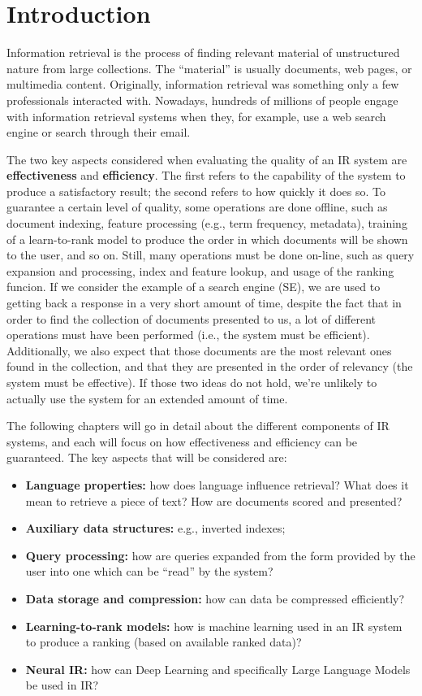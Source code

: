 \chapter{Introduction}

Information retrieval is the process of finding relevant material of unstructured nature from large collections. The ``material'' is usually documents, web pages, or multimedia content. Originally, information retrieval was something only a few professionals interacted with. Nowadays, hundreds of millions of people engage with information retrieval systems when they, for example, use a web search engine or search through their email.

The two key aspects considered when evaluating the quality of an IR system are \textbf{effectiveness} and \textbf{efficiency}. The first refers to the capability of the system to produce a satisfactory result; the second refers to how quickly it does so. To guarantee a certain level of quality, some operations are done offline, such as document indexing, feature processing (e.g., term frequency, metadata), training of a learn-to-rank model to produce the order in which documents will be shown to the user, and so on. Still, many operations must be done on-line, such as query expansion and processing, index and feature lookup, and usage of the ranking funcion. If we consider the example of a search engine (SE), we are used to getting back a response in a very short amount of time, despite the fact that in order to find the collection of documents presented to us, a lot of different operations must have been performed (i.e., the system must be efficient). Additionally, we also expect that those documents are the most relevant ones found in the collection, and that they are presented in the order of relevancy (the system must be effective). If those two ideas do not hold, we're unlikely to actually use the system for an extended amount of time.

The following chapters will go in detail about the different components of IR systems, and each will focus on how effectiveness and efficiency can be guaranteed. The key aspects that will be considered are:
\begin{itemize}
    \item \textbf{Language properties:} how does language influence retrieval? What does it mean to retrieve a piece of text? How are documents scored and presented?
    \item \textbf{Auxiliary data structures:} e.g., inverted indexes;
    \item \textbf{Query processing:} how are queries expanded from the form provided by the user into one which can be ``read'' by the system?
    \item \textbf{Data storage and compression:} how can data be compressed efficiently?
    \item \textbf{Learning-to-rank models:} how is machine learning used in an IR system to produce a ranking (based on available ranked data)?
    \item \textbf{Neural IR:} how can Deep Learning and specifically Large Language Models be used in IR?
\end{itemize}